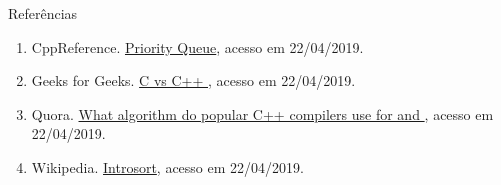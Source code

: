 \begin{frame}[fragile]{Referências}

    \begin{enumerate}
        \item CppReference. \href{https://en.cppreference.com/w/cpp/container/priority_queue}{Priority Queue}, acesso em 22/04/2019.

        \item Geeks for Geeks. \href{https://www.geeksforgeeks.org/c-qsort-vs-c-sort/}{C  vs C++ }, acesso em 22/04/2019.

        \item Quora. \href{https://www.quora.com/What-algorithm-do-popular-C++-compilers-use-for-std-sort-and-std-stable\_sort}{What algorithm do popular C++ compilers use for  and }, acesso em 22/04/2019.

        \item Wikipedia. \href{https://en.wikipedia.org/wiki/Introsort}{Introsort}, acesso em 22/04/2019.

    \end{enumerate}

\end{frame}
